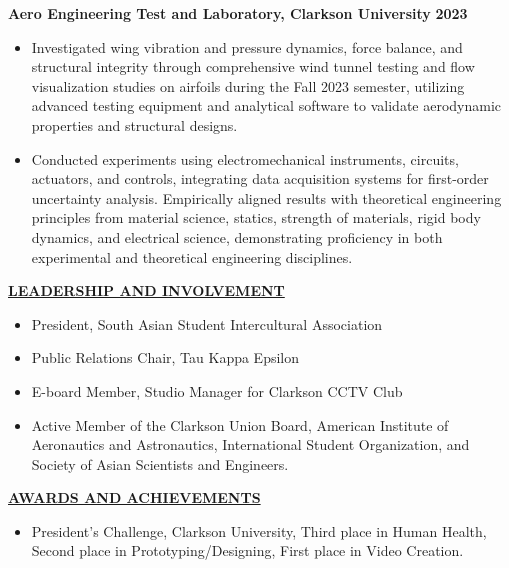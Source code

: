 \documentclass{article}
\begin{document}
\noindent \textbf{Aero Engineering Test and Laboratory, Clarkson University} \hfill \textbf{2023}
\begin{itemize}[noitemsep,nolistsep,leftmargin=*]
\item {\small Investigated wing vibration and pressure dynamics, force balance, and structural integrity through comprehensive wind tunnel testing and flow visualization studies on airfoils during the Fall 2023 semester, utilizing advanced testing equipment and analytical software to validate aerodynamic properties and structural designs.}
\item {\small Conducted experiments using electromechanical instruments, circuits, actuators, and controls, integrating data acquisition systems for first-order uncertainty analysis. Empirically aligned results with theoretical engineering principles from material science, statics, strength of materials, rigid body dynamics, and electrical science, demonstrating proficiency in both experimental and theoretical engineering disciplines.}\\
\end{itemize}




\noindent \textbf{\underline{LEADERSHIP AND INVOLVEMENT}} 
\begin{itemize}[noitemsep,nolistsep,leftmargin=*]
\item {\small President, South Asian Student Intercultural Association}\item {\small Public Relations Chair, Tau Kappa Epsilon}
\item {\small E-board Member, Studio Manager for Clarkson CCTV Club}
\item {\small Active Member of the Clarkson Union Board, American Institute of Aeronautics and Astronautics, International Student Organization, and Society of Asian Scientists and Engineers.}\\
\end{itemize}


\noindent \textbf{\underline{AWARDS AND ACHIEVEMENTS}} 
\begin{itemize}[noitemsep,nolistsep,leftmargin=*]
\item {\small President's Challenge, Clarkson University, Third place in Human Health, Second place in Prototyping/Designing, First place in Video Creation.}
\end{itemize}
\end{document}
